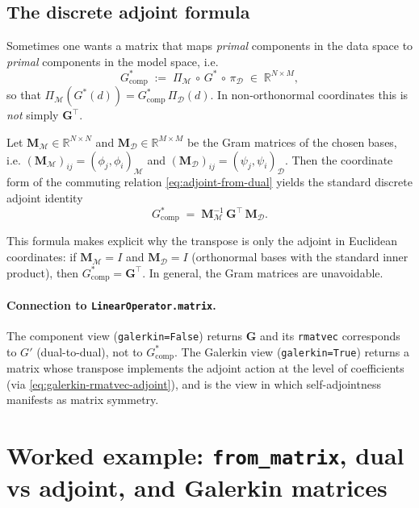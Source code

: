 \documentclass[11pt,twoside,openright]{book}
\theoremstyle{plain}
\theoremstyle{definition}
\theoremstyle{remark}
\newcommand{\modelspace}{\mathcal{M}}
\newcommand{\dataspace}{\mathcal{D}}
\newcommand{\Gd}{\mathbf{G}}              %
\newcommand{\mass}{\mathbf{M}}             %
\newcommand{\ipM}[2]{(#1,#2)_{\modelspace}}
\newcommand{\ipD}[2]{(#1,#2)_{\dataspace}}
\newcommand{\Gadj}{G^*}
\begin{document}
\subsection{The discrete adjoint formula}
\label{ssec:discrete-adjoint}

Sometimes one wants a matrix that maps \emph{primal} components in the data
space to \emph{primal} components in the model space, i.e.
\begin{equation}
  \label{eq:adjoint-component-matrix-def}
  \Gadj_{\mathrm{comp}}\;:=\; \Pi_{\modelspace}\,\circ\,G^*\,\circ\,\pi_{\dataspace}
  \;\in\;\mathbb{R}^{N\times M},
\end{equation}
so that $\Pi_{\modelspace}(G^*(d))=\Gadj_{\mathrm{comp}}\,\Pi_{\dataspace}(d)$.
In non-orthonormal coordinates this is \emph{not} simply $\Gd^\top$.

Let $\mass_{\modelspace}\in\mathbb{R}^{N\times N}$ and
$\mass_{\dataspace}\in\mathbb{R}^{M\times M}$ be the Gram matrices of the
chosen bases, i.e.
\( (\mass_{\modelspace})_{ij}=\ipM{\phi_j}{\phi_i} \) and
\( (\mass_{\dataspace})_{ij}=\ipD{\psi_j}{\psi_i} \).
Then the coordinate form of the commuting relation
\eqref{eq:adjoint-from-dual} yields the standard discrete adjoint identity
\begin{equation}
  \label{eq:discrete-adjoint-formula}
  \Gadj_{\mathrm{comp}} 
  \;=\;
  \mass_{\modelspace}^{-1}\,\Gd^\top\,\mass_{\dataspace}.
\end{equation}

This formula makes explicit why the transpose is only the adjoint in Euclidean
coordinates: if $\mass_{\modelspace}=I$ and $\mass_{\dataspace}=I$ (orthonormal
bases with the standard inner product), then $\Gadj_{\mathrm{comp}}=\Gd^\top$.
In general, the Gram matrices are unavoidable.

\paragraph{Connection to \texttt{LinearOperator.matrix}.}
The component view (\texttt{galerkin=False}) returns $\Gd$ and its
\texttt{rmatvec} corresponds to $G'$ (dual-to-dual), not to
$\Gadj_{\mathrm{comp}}$. The Galerkin view (\texttt{galerkin=True}) returns a
matrix whose transpose implements the adjoint action at the level of
coefficients (via \eqref{eq:galerkin-rmatvec-adjoint}), and is the view in
which self-adjointness manifests as matrix symmetry.

\section{Worked example: \texttt{from\_matrix}, dual vs adjoint, and Galerkin matrices}
\label{sec:linear-operator-worked-example}
\end{document}
